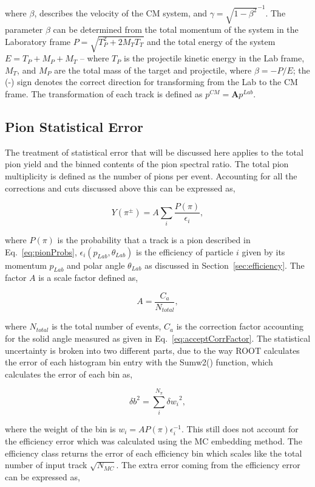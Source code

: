 where $\beta$, describes the velocity of the CM system, and $\gamma=\sqrt{1-\beta^2}^{-1}$. The parameter $\beta$ can be determined from the total momentum of the system in the Laboratory frame $P = \sqrt{ T_{P}^2 + 2M_{T}T_{T}}$ and the total energy of the system $E = T_{P} + M_{P} + M_{T}$ -- where $T_{P}$ is the projectile kinetic energy in the Lab frame, $M_{T}$, and $M_{P}$ are the total mass of the target and projectile, where $\beta = -P/E$; the (-) sign denotes the correct direction for transforming from the Lab to the CM frame. The transformation of each  track is defined as $p^{CM} = \textbf{A}p^{Lab}$.

\subsection{Pion Statistical Error}

The treatment of statistical error that will be discussed here applies to the total pion yield and the binned contents of the pion spectral ratio. The total pion multiplicity is defined as the number of pions per event. Accounting for all the corrections and cuts discussed above this can be expressed as, 

\begin{equation}
Y(\pi^\pm) = A\sum_{i} \frac{P(\pi)}{\epsilon_i},
\end{equation}

where $P(\pi)$ is the probability that a track is a pion described in Eq.~\ref{eq:pionProbs}, $\epsilon_i(p_{Lab}, \theta_{Lab})$ is the efficiency of particle $i$ given by its momentum $p_{Lab}$ and polar angle $\theta_{Lab}$ as discussed in Section~\ref{sec:efficiency}. The factor $A$ is a scale factor defined as,

\begin{equation}
 A = \frac{C_a}{N_{total}},
\end{equation}

where $N_{total}$ is the total number of events, $C_a$ is the correction factor accounting for the solid angle measured as given in Eq.~\ref{eq:acceptCorrFactor}. The statistical uncertainty is broken into two different parts, due to the way ROOT calculates the error of each histogram bin entry with the Sumw2() function, which calculates the error of each bin as,

\begin{equation}
{\delta b}^2 = \sum_i^{N_{\pi}} {\delta w_i}^2,
\end{equation}

where the weight of the bin is $w_i = A P(\pi) \epsilon_i^{-1}$. This still does not account for the efficiency error which was calculated using the MC embedding method. The efficiency class returns the error of each efficiency bin which scales like the total number of input track $\sqrt{N_{MC}}$. The extra error coming from the efficiency error can be expressed as,

